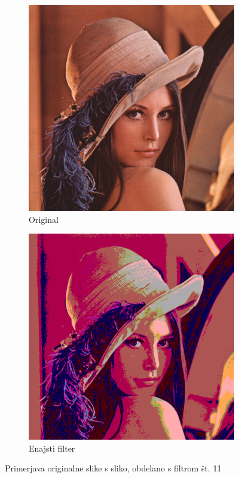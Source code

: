 \documentclass[a4paper, 12pt]{book}
\begin{document}
\begin{figure}[!ht]
    \centering
    \begin{subfigure}[b]{0.4\textwidth}
        \includegraphics[width=\textwidth]{lena}
        \caption{Original}
    \end{subfigure}
    \begin{subfigure}[b]{0.4\textwidth}
        \includegraphics[width=\textwidth]{lena_filter_11}
        \caption{Enajsti filter}
    \end{subfigure}
    \caption{Primerjava originalne slike s sliko, obdelano s filtrom št. 11}
    \label{fig:lena_filter_11}
\end{figure}
\end{document}
